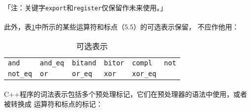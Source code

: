 「注：关键字\texttt{export}和\texttt{register}仅保留作未来使用。」

\paragraph{}
此外，表\ref{tab:alt-rep-op-punc}中所示的某些运算符和标点（5.5）的可选表示保留，
不应作他用：

\begin{table}[h!]
  \centering
  \caption{可选表示}
  \begin{tabular}{|llllll|}
    \hline
    \texttt{and}       & \texttt{and\_eq} & \texttt{bitand} & \texttt{bitor}   &
      \texttt{compl}   & \texttt{not}                                         \\
    \texttt{not\_eq}   & \texttt{or}      & \texttt{or\_eq} & \texttt{xor}     &
      \texttt{xor\_eq} &                                                      \\
    \hline
  \end{tabular}
  \label{tab:alt-rep-op-punc}
\end{table}

\paragraph{}
C++程序的词法表示包括多个预处理标记，它们在预处理器的语法中使用，或者被转换成
运算符和标点的标记：
\pagebreak

